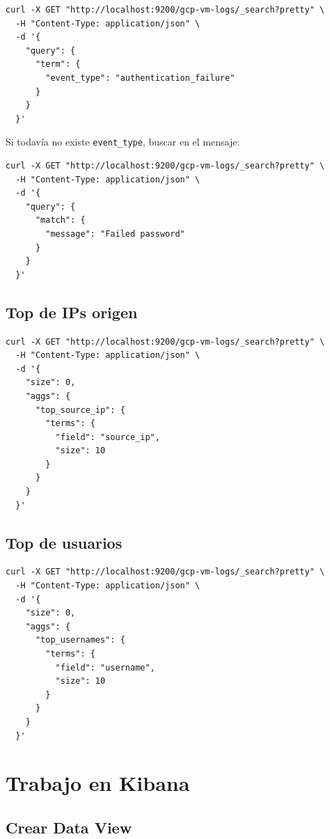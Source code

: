 \documentclass[
  coursetitle={Cómputo Nube y Tecnologías Emergentes},
  coursehours={96},
  coursedate={Verano 2026},
  doctype={Práctica},
  otherlangs={english,french},
  authorname={Lázaro},
  authorsurname={Bustio-Martínez},
  authortitle={PhD},
  role={Profesor Investigador},
  email={lbustio@inaoe.mx},
  phone={5559504000},
  ext={7459},
  institution={Instituto Nacional de Astrofísica, Óptica y Electrónica (INAOE)},
  department={Maestría en Ciencias en Tecnologías de Seguridad},
  address={Luis Enrique Erro 1, Sta. Ma. Tonantzintla, San Andrés Cholula, CP 72840, Puebla, México},
  margin={0.5in}
]{../../lbustio_lecture_notes}
\begin{document}
\begin{lstlisting}
curl -X GET "http://localhost:9200/gcp-vm-logs/_search?pretty" \
  -H "Content-Type: application/json" \
  -d '{
    "query": {
      "term": {
        "event_type": "authentication_failure"
      }
    }
  }'
\end{lstlisting}

Si todavía no existe \texttt{event\_type}, buscar en el mensaje:

\begin{lstlisting}
curl -X GET "http://localhost:9200/gcp-vm-logs/_search?pretty" \
  -H "Content-Type: application/json" \
  -d '{
    "query": {
      "match": {
        "message": "Failed password"
      }
    }
  }'
\end{lstlisting}

\subsection{Top de IPs origen}

\begin{lstlisting}
curl -X GET "http://localhost:9200/gcp-vm-logs/_search?pretty" \
  -H "Content-Type: application/json" \
  -d '{
    "size": 0,
    "aggs": {
      "top_source_ip": {
        "terms": {
          "field": "source_ip",
          "size": 10
        }
      }
    }
  }'
\end{lstlisting}

\subsection{Top de usuarios}

\begin{lstlisting}
curl -X GET "http://localhost:9200/gcp-vm-logs/_search?pretty" \
  -H "Content-Type: application/json" \
  -d '{
    "size": 0,
    "aggs": {
      "top_usernames": {
        "terms": {
          "field": "username",
          "size": 10
        }
      }
    }
  }'
\end{lstlisting}

\section{Trabajo en Kibana}

\subsection{Crear Data View}
\end{document}
